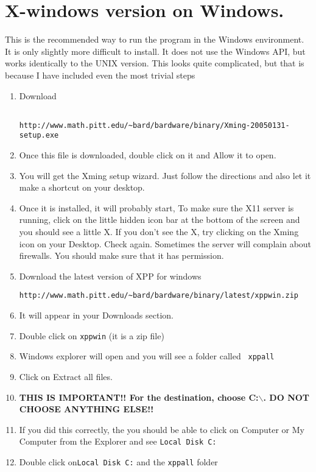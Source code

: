 \documentclass{article}
\begin{document}
\section{X-windows version on Windows.} This is the recommended way
to run the program in the Windows environment. It is only slightly 
more difficult to
install. It does not use the Windows API, 
but works identically to the UNIX version.
This looks quite complicated, but that is because I have included even
the most trivial steps

\begin{enumerate}
\item Download
\begin{verbatim}

http://www.math.pitt.edu/~bard/bardware/binary/Xming-20050131-setup.exe
\end{verbatim}
\item Once this file is downloaded, double click on it and Allow it to
open.
\item You will get the Xming setup wizard. Just follow the directions
and also let it make a shortcut on your desktop.
\item Once it is installed, it will probably start,  To make sure the
X11 server is running, click on the little hidden icon bar at the
bottom of the screen and you should see a little X. 
If you don't see the X, try clicking on the Xming icon on your
Desktop. Check again. Sometimes the server will complain about
firewalls. You should make sure that it has permission.
\item Download the latest version of XPP for windows
\begin{verbatim}
http://www.math.pitt.edu/~bard/bardware/binary/latest/xppwin.zip
\end{verbatim}
\item It will appear in your Downloads section.
\item Double click on {\tt xppwin} (it is a zip file)
\item Windows explorer will open and you will see a folder called {\tt
xppall} 
\item Click on Extract all files.
\item {\bf THIS IS IMPORTANT!! For the destination, choose
C:$\backslash$. DO NOT CHOOSE ANYTHING ELSE!!}
\item If you did this correctly, the  you should be able to click on
Computer  or My Computer from the Explorer and see {\tt Local Disk C:}
\item Double click on{\tt Local Disk C:}  and the {\tt xppall} folder

\end{enumerate}
\end{document}
